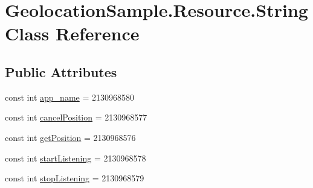 \hypertarget{class_geolocation_sample_1_1_resource_1_1_string}{\section{Geolocation\+Sample.\+Resource.\+String Class Reference}
\label{class_geolocation_sample_1_1_resource_1_1_string}
}
\subsection*{Public Attributes}
\begin{DoxyCompactItemize}
\item 
const int \hyperlink{class_geolocation_sample_1_1_resource_1_1_string_a327048e7930588e8a97c55222d0959e5}{app\+\_\+name} = 2130968580
\item 
const int \hyperlink{class_geolocation_sample_1_1_resource_1_1_string_ab443de0f81a6cebfb1a6b7cfc08d7252}{cancel\+Position} = 2130968577
\item 
const int \hyperlink{class_geolocation_sample_1_1_resource_1_1_string_a54fb35b04d2310af765de60c2853254b}{get\+Position} = 2130968576
\item 
const int \hyperlink{class_geolocation_sample_1_1_resource_1_1_string_a08fed6ff6a2847cf28bfefdd2efa3626}{start\+Listening} = 2130968578
\item 
const int \hyperlink{class_geolocation_sample_1_1_resource_1_1_string_a25eca757564b4fc2945ae40e60992bb5}{stop\+Listening} = 2130968579
\end{DoxyCompactItemize}


